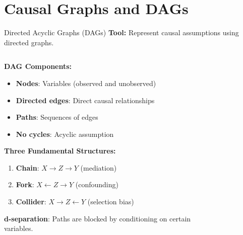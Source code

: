 \documentclass[aspectratio=169,11pt]{beamer}
\begin{document}
\section{Causal Graphs and DAGs}

\begin{frame}{Directed Acyclic Graphs (DAGs)}
\textbf{Tool:} Represent causal assumptions using directed graphs.

\begin{columns}
\begin{column}{0.6\textwidth}
\textbf{DAG Components:}
\begin{itemize}
\item \textbf{Nodes}: Variables (observed and unobserved)
\item \textbf{Directed edges}: Direct causal relationships
\item \textbf{Paths}: Sequences of edges
\item \textbf{No cycles}: Acyclic assumption
\end{itemize}

\vspace{0.3cm}
\textbf{Three Fundamental Structures:}

\begin{enumerate}
\item \textbf{Chain}: $X \to Z \to Y$ (mediation)
\item \textbf{Fork}: $X \leftarrow Z \rightarrow Y$ (confounding)
\item \textbf{Collider}: $X \rightarrow Z \leftarrow Y$ (selection bias)
\end{enumerate}

\vspace{0.3cm}
\textbf{d-separation}: Paths are blocked by conditioning on certain variables.
\end{column}
\begin{column}{0.4\textwidth}
\begin{figure}
\centering
{}
\end{figure}
\end{column}
\end{columns}
\end{frame}
\end{document}
